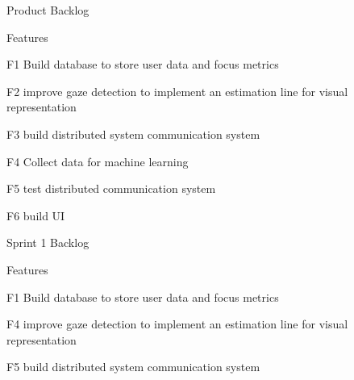\documentclass[12pt]{article}
\begin{document}
\begin{sectionbox}[colback=white]{Product Backlog}
\begin{subsectionbox}[colback=white]{Features}
\begin{featurebox}[colback=white]{F1}
Build database to store user data and focus metrics
\end{featurebox}
\begin{featurebox}[colback=white]{F2}
improve gaze detection to implement an estimation line for visual representation
\end{featurebox}
\begin{featurebox}[colback=white]{F3}
build distributed system communication system
\end{featurebox}
\begin{featurebox}[colback=white]{F4}
Collect data for machine learning
\end{featurebox}
\begin{featurebox}[colback=white]{F5}
test distributed communication system
\end{featurebox}
\begin{featurebox}[colback=white]{F6}
build UI
\end{featurebox}

\end{subsectionbox}
\end{sectionbox}

\begin{sectionbox}[colback=white]{Sprint 1 Backlog}
\begin{subsectionbox}[colback=white]{Features}
\begin{featurebox}[colback=white]{F1}
Build database to store user data and focus metrics
\end{featurebox}
\begin{featurebox}[colback=white]{F4}
improve gaze detection to implement an estimation line for visual representation
\end{featurebox}
\begin{featurebox}[colback=white]{F5}
build distributed system communication system
\end{featurebox}
\end{subsectionbox}
\end{sectionbox}
\end{document}
